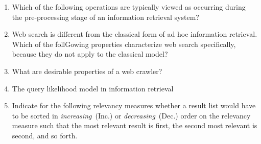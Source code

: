 \documentclass[exam, sectionseven]{acAssignment}
\begin{document}
\begin{enumerate}
    \item Which of the following operations are typically viewed as occurring during the pre-processing stage of an information retrieval system?
        \begin{acMultipleChoice}
        \end{acMultipleChoice}
    
    \item Web search is different from the classical form of ad hoc information retrieval.
        Which of the follGowing properties characterize web search specifically, because they do not apply to the classical model?
        \begin{acMultipleChoice}
        \end{acMultipleChoice}
    
    \item What are desirable properties of a web crawler?
        \begin{acMultipleChoice}
        \end{acMultipleChoice}
    
    \item The query likelihood model in information retrieval\textellipsis
        \begin{acMultipleChoice}
        \end{acMultipleChoice}
    
    \item Indicate for the following relevancy measures whether a result list would have to be sorted in \emph{increasing}~(Inc.) or \emph{decreasing}~(Dec.) order on the relevancy measure such that the most relevant result is first, the second most relevant is second, and so forth.
        \begin{acMultipleChoice}
        \end{acMultipleChoice}
    

\end{enumerate}
\end{document}
